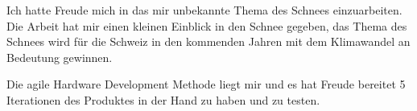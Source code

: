 

Ich hatte Freude mich in das mir unbekannte Thema des Schnees einzuarbeiten. Die Arbeit hat mir einen kleinen Einblick in den Schnee gegeben, das Thema des Schnees wird für die Schweiz in den kommenden Jahren mit dem Klimawandel an Bedeutung gewinnen.

Die agile Hardware Development Methode liegt mir und es hat Freude bereitet 5 Iterationen des Produktes in der Hand zu haben und zu testen.

